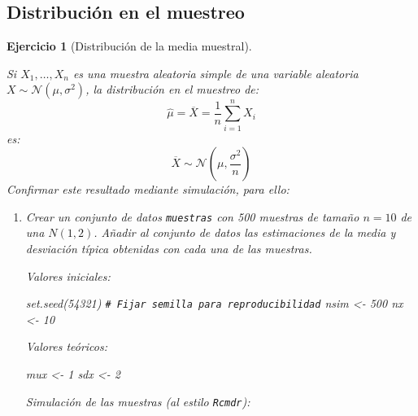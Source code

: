 \documentclass[
  10pt,
]{book}
\newenvironment{Shaded}{\begin{snugshade}}{\end{snugshade}}
\newcommand{\CommentTok}[1]{\textcolor[rgb]{0.56,0.35,0.01}{\textit{#1}}}
\newcommand{\DecValTok}[1]{\textcolor[rgb]{0.00,0.00,0.81}{#1}}
\newcommand{\FunctionTok}[1]{\textcolor[rgb]{0.00,0.00,0.00}{#1}}
\newcommand{\NormalTok}[1]{#1}
\newcommand{\OtherTok}[1]{\textcolor[rgb]{0.56,0.35,0.01}{#1}}
\theoremstyle{break}
\newtheorem{exercise}{Ejercicio}[chapter]
\theoremstyle{nonumberplain}
\renewcommand{\CommentTok}[1]{\textcolor[rgb]{0.41,0.41,0.41}{\texttt{#1}}}
\begin{document}
\hypertarget{distribuciuxf3n-en-el-muestreo}{%
\subsection{Distribución en el muestreo}\label{distribuciuxf3n-en-el-muestreo}}

\begin{exercise}[Distribución de la media muestral]
\protect\hypertarget{exr:distr-media}{}\label{exr:distr-media}

Si \(X_{1},\ldots,X_{n}\) es una muestra aleatoria simple de una
variable aleatoria \(X \sim \mathcal{N}\left( \mu, \sigma^2 \right)\), la
distribución en el muestreo de:
\[\hat{\mu}=\overline{X}=\dfrac{1}{n}\sum_{i=1}^{n}X_{i}\]
es:
\[\overline{X} \sim \mathcal{N}\left(  \mu,\dfrac{\sigma^2}{n}\right)\]
Confirmar este resultado mediante simulación, para ello:

\begin{enumerate}
\def\labelenumi{\alph{enumi})}
\item
  Crear un conjunto de datos \texttt{muestras} con 500 muestras de tamaño
  \(n=10\) de una \(N(1,2)\). Añadir al conjunto de datos las
  estimaciones de la media y desviación típica obtenidas con cada
  una de las muestras.

  Valores iniciales:

\begin{Shaded}
\begin{Highlighting}[]
\FunctionTok{set.seed}\NormalTok{(}\DecValTok{54321}\NormalTok{) }\CommentTok{\# Fijar semilla para reproducibilidad}
\NormalTok{nsim }\OtherTok{\textless{}{-}} \DecValTok{500}
\NormalTok{nx }\OtherTok{\textless{}{-}} \DecValTok{10}
\end{Highlighting}
\end{Shaded}

  Valores teóricos:

\begin{Shaded}
\begin{Highlighting}[]
\NormalTok{mux }\OtherTok{\textless{}{-}} \DecValTok{1}
\NormalTok{sdx }\OtherTok{\textless{}{-}} \DecValTok{2}
\end{Highlighting}
\end{Shaded}

  Simulación de las muestras (al estilo \texttt{Rcmdr}):


\end{enumerate}
\end{exercise}
\end{document}
